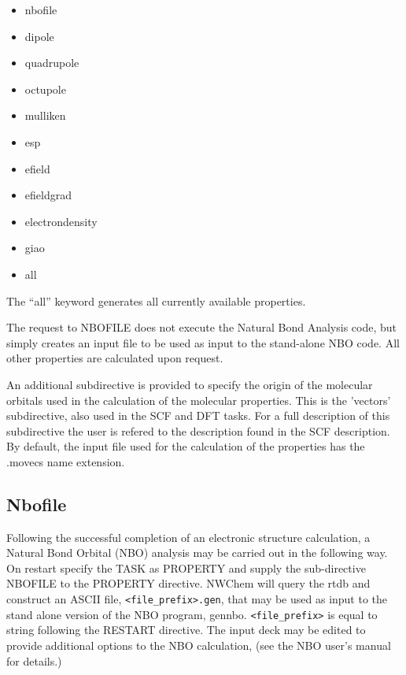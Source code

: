 \begin{itemize}
\item nbofile
\item dipole
\item quadrupole
\item octupole
\item mulliken
\item esp
\item efield
\item efieldgrad
\item electrondensity
\item giao 
\item all 
\end{itemize}

The ``all'' keyword generates all currently available properties. 

The request to NBOFILE does not execute the Natural Bond Analysis
code, but simply creates an input file to be used as input to the
stand-alone NBO code. All other properties are calculated upon
request.

An additional subdirective is provided to specify the origin of the
molecular orbitals used in the calculation of the molecular
properties. This is the 'vectors' subdirective, also used in the
SCF and DFT tasks. For a full description of this subdirective
the user is refered to the description found in the SCF description.
By default, the input file used for the calculation of the properties
has the .movecs name extension. 

\subsection{Nbofile}

Following the successful completion of an electronic structure
calculation, a Natural Bond Orbital (NBO) analysis may be carried out
in the following way.  On restart specify the TASK as PROPERTY and
supply the sub-directive NBOFILE to the PROPERTY directive.  NWChem
will query the rtdb and construct an ASCII file,
\verb+<file_prefix>.gen+, that may be used as input to the stand alone
version of the NBO program, gennbo.  \verb+<file_prefix>+ is equal to
string following the RESTART directive.  The input deck may be edited
to provide additional options to the NBO calculation, (see the NBO
user's manual for details.)

